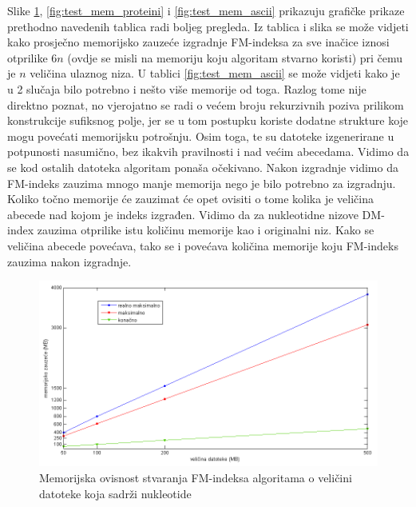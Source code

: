 Slike \ref{fig:test_mem_nukl}, \ref{fig:test_mem_proteini} i \ref{fig:test_mem_ascii} prikazuju grafičke prikaze prethodno navedenih tablica radi boljeg pregleda. Iz tablica i slika se može vidjeti kako prosječno memorijsko zauzeće izgradnje FM-indeksa za sve inačice iznosi otprilike $6n$ (ovdje se misli na memoriju koju algoritam stvarno koristi) pri čemu je $n$ veličina ulaznog niza. U tablici \ref{fig:test_mem_ascii} se može vidjeti kako je u 2 slučaja bilo potrebno i nešto više memorije od toga. Razlog tome nije direktno poznat, no vjerojatno se radi o većem broju rekurzivnih poziva prilikom konstrukcije sufiksnog polje, jer se u tom postupku koriste dodatne strukture koje mogu povećati memorijsku potrošnju. Osim toga, te su datoteke izgenerirane u potpunosti nasumično, bez ikakvih pravilnosti i nad većim abecedama. Vidimo da se kod ostalih datoteka algoritam ponaša očekivano. Nakon izgradnje vidimo da FM-indeks zauzima mnogo manje memorija nego je bilo potrebno za izgradnju. Koliko točno memorije će zauzimat će opet ovisiti o tome kolika je veličina abecede nad kojom je indeks izgrađen. Vidimo da za nukleotidne nizove DM-index zauzima otprilike istu količinu memorije kao i originalni niz. Kako se veličina abecede povećava, tako se i povećava količina memorije koju FM-indeks zauzima nakon izgradnje.


\begin{figure}[H]
   \centering
       \includegraphics[width=\textwidth]{./pictures/test_mem_nukl.png}
 \caption{Memorijska ovisnost stvaranja FM-indeksa algoritama o veličini datoteke koja sadrži nukleotide}
 \label{fig:test_mem_nukl}
\end{figure}

